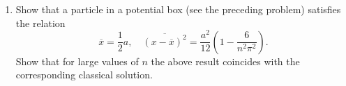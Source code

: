 \documentclass[a4paper]{article}
\DeclareMathOperator{\N}{\mathbf{N}}
\DeclareMathOperator{\R}{\mathbf{R}}
\theoremstyle{definition}
\newtheorem*{sol}{Solution}
\begin{document}
\begin{enumerate}
\begin{sol}
\begin{equation}
                    E_n
                    = \frac{\hbar^2 \pi^2 n^2}{2ma^2},
                    \quad n \in \N.
                \end{equation}
                The probabilistic interpretation of quantum
                mechanics requires that the valid wave
                functions be normalized, so
                \begin{align}
                    \int_{\R}
                    |\psi_n(x)|^2 \, dx
                    &= \int_{0}^{a} |A|^2 \sin^2\left(
                    \frac{n\pi}{a} x \right)  \, dx
                    \\
                    &= |A|^2 \int_0^{a} \frac{1 - \cos\left(
                    \frac{2n\pi}{a} x \right) }{2} \, dx \\
                    &= |A|^2 \frac{a}{2}.
                \end{align}
                Therefore $A = \sqrt{2 / a}$ and we are
                done:
                \begin{equation}
                    E_n
                    = \frac{\hbar^2\pi^2}{2ma^2} n^2,
                    \quad
                    \psi_n(x)
                    = \sqrt{\frac{2}{a}} \sin\left(
                    \frac{\pi n}{a} x \right)
                    \quad
                    \text{for}
                    \quad
                    n \in \N.
                \end{equation}
            \end{sol}

            \break

        \item Show that a particle in a potential box (see
            the preceding problem) satisfies the relation
            \begin{equation}
                \overline{x}
                = \frac{1}{2} a,
                \quad 
                \overline{(x-\overline{x})^2}
                = \frac{a^2}{12} \left( 1 -
                \frac{6}{n^2\pi^2} \right).
            \end{equation}
            Show that for large values of $n$ the above
            result coincides with the corresponding
            classical solution.


\end{enumerate}
\end{document}
